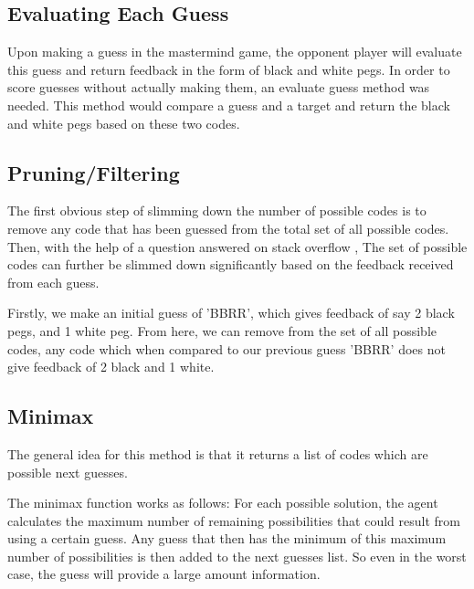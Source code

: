 \documentclass[12pt]{article}
\begin{document}
\subsection{Evaluating Each Guess}
Upon making a guess in the mastermind game, the opponent player will evaluate this guess and return feedback in the form of black and white pegs. In order to score guesses without actually making them, an evaluate guess method was needed. This method would compare a guess and a target and return the black and white pegs based on these two codes. 


\subsection{Pruning/Filtering}
The first obvious step of slimming down the number of possible codes is to remove any code that has been guessed from the total set of all possible codes. Then, with the help of a question answered on stack overflow \cite{stack overflow pruning}, The set of possible codes can further be slimmed down significantly based on the feedback received from each guess. 

Firstly, we make an initial guess of 'BBRR', which gives feedback of say 2 black pegs, and 1 white peg. From here, we can remove from the set of all possible codes, any code which when compared to our previous guess 'BBRR' does not give feedback of 2 black and 1 white. 

\subsection{Minimax}
The general idea for this method is that it returns a list of codes which are possible next guesses. 

The minimax function works as follows:
For each possible solution, the agent calculates the maximum number of remaining possibilities that could result from using a certain guess. Any guess that then has the minimum of this maximum number of possibilities is then added to the next guesses list. So even in the worst case, the guess will provide a large amount information.
\end{document}
